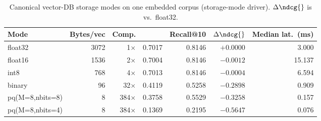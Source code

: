 \begin{table}[t]
\centering
\small
\caption{Canonical vector-DB storage modes on one embedded corpus (storage-mode driver). $\Delta\ndcg{}$ is vs.\ float32.}
\label{tab:storage-modes}
\begin{tabular}{lrrrrrr}
\toprule
Mode & Bytes/vec & Comp. & \ndcg{} & Recall@10 & $\Delta\ndcg{}$ & Median lat.\ (ms) \\
\midrule
float32 & 3072 & 1$\times$ & 0.7017 & 0.8146 & $+0.0000$ & 3.000 \\
float16 & 1536 & 2$\times$ & 0.7004 & 0.8146 & $-0.0012$ & 15.137 \\
int8 & 768 & 4$\times$ & 0.7013 & 0.8146 & $-0.0004$ & 6.594 \\
binary & 96 & 32$\times$ & 0.4119 & 0.5258 & $-0.2898$ & 0.909 \\
pq(M=8,nbits=8) & 8 & 384$\times$ & 0.3758 & 0.5529 & $-0.3258$ & 0.157 \\
pq(M=8,nbits=4) & 8 & 384$\times$ & 0.1369 & 0.2195 & $-0.5647$ & 0.076 \\
\bottomrule
\end{tabular}
\end{table}
